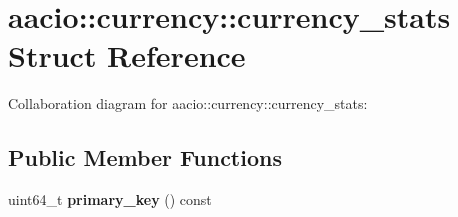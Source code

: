 \hypertarget{structaacio_1_1currency_1_1currency__stats}{}\section{aacio\+:\+:currency\+:\+:currency\+\_\+stats Struct Reference}
\label{structaacio_1_1currency_1_1currency__stats}


Collaboration diagram for aacio\+:\+:currency\+:\+:currency\+\_\+stats\+:
\subsection*{Public Member Functions}
\begin{DoxyCompactItemize}
\item 
\mbox{\label{structaacio_1_1currency_1_1currency__stats_addef767e2a04d773a52a476469efc3bf}} 
uint64\+\_\+t {\bfseries primary\+\_\+key} () const
\end{DoxyCompactItemize}
